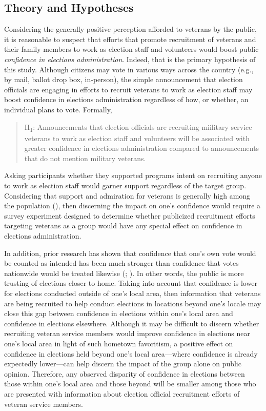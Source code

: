 \documentclass[
  12pt,
  letterpaper,
]{article}
\begin{document}
\subsection{Theory and Hypotheses}\label{theory-and-hypotheses}

Considering the generally positive perception afforded to veterans by
the public, it is reasonable to suspect that efforts that promote
recruitment of veterans and their family members to work as election
staff and volunteers would boost public \emph{confidence in elections
administration}. Indeed, that is the primary hypothesis of this study.
Although citizens may vote in various ways across the country (e.g., by
mail, ballot drop box, in-person), the simple announcement that election
officials are engaging in efforts to recruit veterans to work as
election staff may boost confidence in elections administration
regardless of how, or whether, an individual plans to vote. Formally,

\begin{quote}
H\textsubscript{1}: Announcements that election officials are recruiting
miilitary service veterans to work as election staff and volunteers will
be associated with greater confidence in elections administration
compared to announcements that do not mention military veterans.
\end{quote}

Asking participants whether they supported programs intent on recruiting
anyone to work as election staff would garner support regardless of the
target group. Considering that support and admiration for veterans is
generally high among the population
(), then
discerning the impact on one's confidence would require a survey
experiment designed to determine whether publicized recruitment efforts
targeting veterans as a group would have any special effect on
confidence in elections administration.

In addition, prior research has shown that confidence that one's own
vote would be counted as intended has been much stronger than confidence
that votes nationwide would be treated likewise
(;
). In other words, the public is
more trusting of elections closer to home. Taking into account that
confidence is lower for elections conducted outside of one's local area,
then information that veterans are being recruited to help conduct
elections in locations beyond one's locale may close this gap between
confidence in elections within one's local area and confidence in
elections elsewhere. Although it may be difficult to discern whether
recruiting veteran service members would improve confidence in elections
near one's local area in light of such hometown favoritism, a positive
effect on confidence in elections held beyond one's local area---where
confidence is already expectedly lower---can help discern the impact of
the group alone on public opinion. Therefore, any observed disparity of
confidence in elections between those within one's local area and those
beyond will be smaller among those who are presented with information
about election official recruitment efforts of veteran service members.
\end{document}
